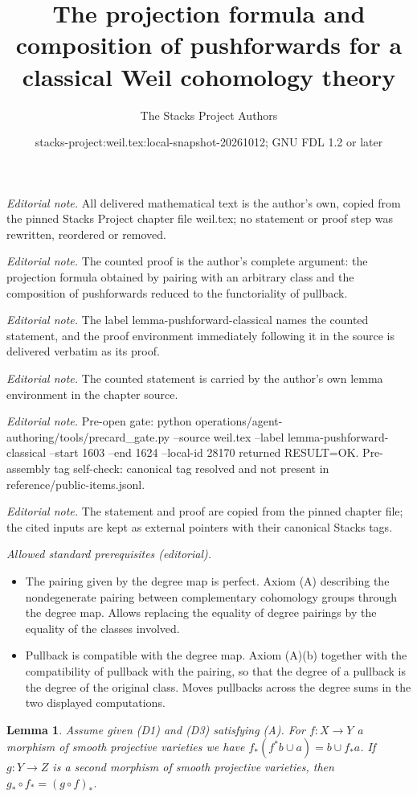 \documentclass[10pt,a4paper]{amsart}
\title{The projection formula and composition of pushforwards for a classical Weil cohomology theory}
\author{The Stacks Project Authors}
\date{stacks-project:weil.tex:local-snapshot-20261012; GNU FDL 1.2 or later}
\theoremstyle{plain}
\newtheorem{lemma}[subsection]{Lemma}
\theoremstyle{definition}
\theoremstyle{remark}
\numberwithin{equation}{subsection}
\begin{document}
\maketitle
\noindent\textit{Editorial note.} All delivered mathematical text is the author's own, copied from the pinned Stacks Project chapter file weil.tex; no statement or proof step was rewritten, reordered or removed.\par\medskip
\noindent\textit{Editorial note.} The counted proof is the author's complete argument: the projection formula obtained by pairing with an arbitrary class and the composition of pushforwards reduced to the functoriality of pullback.\par\medskip
\noindent\textit{Editorial note.} The label lemma-pushforward-classical names the counted statement, and the proof environment immediately following it in the source is delivered verbatim as its proof.\par\medskip
\noindent\textit{Editorial note.} The counted statement is carried by the author's own lemma environment in the chapter source.\par\medskip
\noindent\textit{Editorial note.} Pre-open gate: python operations/agent-authoring/tools/precard\_gate.py --source weil.tex --label lemma-pushforward-classical --start 1603 --end 1624 --local-id 28170 returned RESULT=OK. Pre-assembly tag self-check: canonical tag resolved and not present in reference/public-items.jsonl.\par\medskip
\noindent\textit{Editorial note.} The statement and proof are copied from the pinned chapter file; the cited inputs are kept as external pointers with their canonical Stacks tags.\par\medskip
\noindent\textit{Allowed standard prerequisites (editorial).}\begin{itemize}
\item The pairing given by the degree map is perfect. Axiom (A) describing the nondegenerate pairing between complementary cohomology groups through the degree map. Allows replacing the equality of degree pairings by the equality of the classes involved.
\item Pullback is compatible with the degree map. Axiom (A)(b) together with the compatibility of pullback with the pairing, so that the degree of a pullback is the degree of the original class. Moves pullbacks across the degree sums in the two displayed computations.
\end{itemize}\medskip
\begin{lemma}
\label{lemma-pushforward-classical}
Assume given (D1) and (D3) satisfying (A). For $f : X \to Y$
a morphism of smooth projective varieties we have
$f_*(f^*b \cup a) = b \cup f_*a$. If $g : Y \to Z$ is a second morphism
of smooth projective varieties, then $g_* \circ f_* = (g \circ f)_*$.
\end{lemma}
\end{document}
